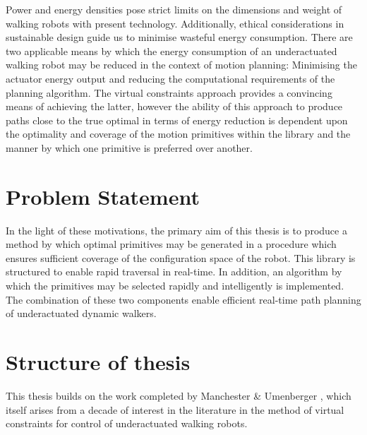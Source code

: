 Power and energy densities pose strict limits on the dimensions and weight of walking robots with present technology. Additionally, ethical considerations in sustainable design guide us to minimise wasteful energy consumption. There are two applicable means by which the energy consumption of an underactuated walking robot may be reduced in the context of motion planning: Minimising the actuator energy output and reducing the computational requirements of the planning algorithm. The virtual constraints approach provides a convincing means of achieving the latter, however the ability of this approach to produce paths close to the true optimal in terms of energy reduction is dependent upon the optimality and coverage of the motion primitives within the library and the manner by which one primitive is preferred over another.

\section{Problem Statement}
In the light of these motivations, the primary aim of this thesis is to produce a method by which optimal primitives may be generated in a procedure which ensures sufficient coverage of the configuration space of the robot. This library is structured to enable rapid traversal in real-time. In addition, an algorithm by which the primitives may be selected rapidly and intelligently is implemented. The combination of these two components enable efficient real-time path planning of underactuated dynamic walkers.

\section{Structure of thesis}
This thesis builds on the work completed by Manchester \& Umenberger \cite{manchester13planning}, which itself arises from a decade of interest in the literature in the method of virtual constraints for control of underactuated walking robots.

